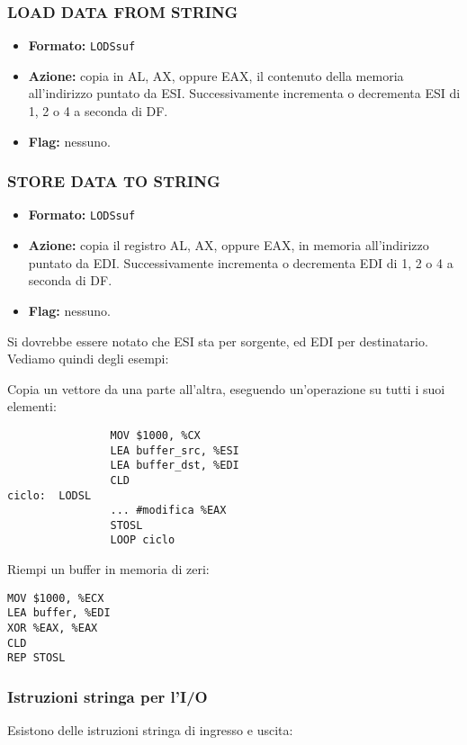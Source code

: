 \documentclass[a4paper,11pt]{article}
\begin{document}
\subsubsection{LOAD DATA FROM STRING}
\begin{itemize}
	\item \textbf{Formato:} \lstinline|LODSsuf| 
	\item \textbf{Azione:} copia in AL, AX, oppure EAX, il contenuto della memoria all'indirizzo puntato da ESI. Successivamente incrementa o decrementa ESI di 1, 2 o 4 a seconda di DF.
	\item \textbf{Flag:} nessuno.
\end{itemize}

\subsubsection{STORE DATA TO STRING}
\begin{itemize}
	\item \textbf{Formato:} \lstinline|LODSsuf| 
	\item \textbf{Azione:} copia il registro AL, AX, oppure EAX, in memoria all'indirizzo puntato da EDI. Successivamente incrementa o decrementa EDI di 1, 2 o 4 a seconda di DF.
	\item \textbf{Flag:} nessuno.
\end{itemize}

Si dovrebbe essere notato che ESI sta per sorgente, ed EDI per destinatario.
Vediamo quindi degli esempi:

\begin{minipage}{0.45\textwidth}
Copia un vettore da una parte all'altra, eseguendo un'operazione su tutti i suoi elementi:
\begin{lstlisting}	
				MOV $1000, %CX
				LEA buffer_src, %ESI
				LEA buffer_dst, %EDI
				CLD
ciclo:	LODSL
				...	#modifica %EAX
				STOSL
				LOOP ciclo
\end{lstlisting}

\end{minipage}%
\hfill %
\begin{minipage}{0.45\textwidth}
Riempi un buffer in memoria di zeri:
\begin{lstlisting}	
MOV $1000, %ECX
LEA buffer, %EDI
XOR %EAX, %EAX
CLD
REP STOSL
\end{lstlisting}
\end{minipage}

\subsubsection{Istruzioni stringa per l'I/O}
Esistono delle istruzioni stringa di ingresso e uscita: 
\end{document}
